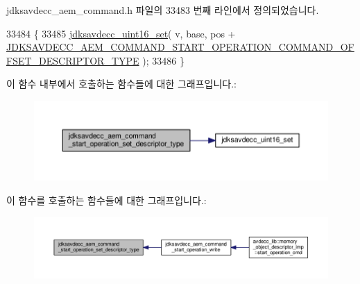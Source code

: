 jdksavdecc\+\_\+aem\+\_\+command.\+h 파일의 33483 번째 라인에서 정의되었습니다.


\begin{DoxyCode}
33484 \{
33485     \hyperlink{group__endian_ga14b9eeadc05f94334096c127c955a60b}{jdksavdecc\_uint16\_set}( v, base, pos + 
      \hyperlink{group__command__start__operation_ga80e1dec5ecd05e09cfebee1c16c5ec22}{JDKSAVDECC\_AEM\_COMMAND\_START\_OPERATION\_COMMAND\_OFFSET\_DESCRIPTOR\_TYPE}
       );
33486 \}
\end{DoxyCode}


이 함수 내부에서 호출하는 함수들에 대한 그래프입니다.\+:
\nopagebreak
\begin{figure}[H]
\begin{center}
\leavevmode
\includegraphics[width=350pt]{group__command__start__operation_gaee59238787b331c4fa0df198cf9d3b5c_cgraph}
\end{center}
\end{figure}




이 함수를 호출하는 함수들에 대한 그래프입니다.\+:
\nopagebreak
\begin{figure}[H]
\begin{center}
\leavevmode
\includegraphics[width=350pt]{group__command__start__operation_gaee59238787b331c4fa0df198cf9d3b5c_icgraph}
\end{center}
\end{figure}


